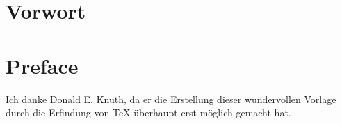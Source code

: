 {\chapter*{Vorwort}}
{\chapter*{Preface}}

Ich danke Donald E. Knuth, da er die Erstellung dieser wundervollen Vorlage durch die Erfindung von TeX überhaupt erst möglich gemacht hat.

\cleardoublepage